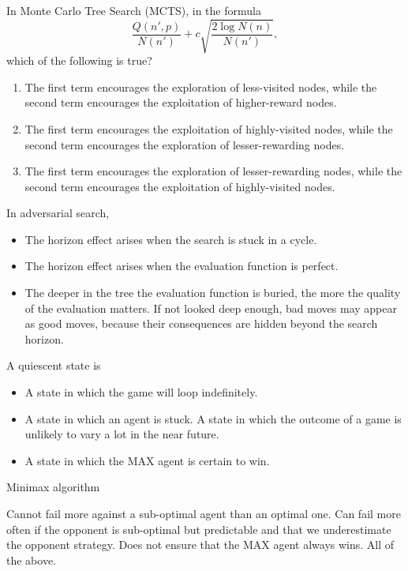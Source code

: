 \documentclass[11pt, a4paper]{article}
\begin{document}
In Monte Carlo Tree Search (MCTS), in the formula
    \begin{equation*}
        \frac{Q(n', p)}{N(n')} + c \sqrt{\frac{2 \log N(n)}{N(n')}},
    \end{equation*}
which of the following is true?
\begin{enumerate}
    \solitem The first term encourages the exploitation of higher-reward nodes, while the second encourages the exploration of
    less-visited nodes.
    \item The first term encourages the exploration of less-visited nodes, while the second term encourages the exploitation
    of higher-reward nodes.
    \item The first term encourages the exploitation of highly-visited nodes, while the second term encourages the exploration
    of lesser-rewarding nodes.
    \item The first term encourages the exploration of lesser-rewarding nodes, while the second term encourages the exploitation of highly-visited nodes.
\end{enumerate}

In adversarial search,
\begin{itemize}
    \item The horizon effect arises when the search is stuck in a cycle.
    \item The horizon effect arises when the evaluation function is perfect.
    \item The deeper in the tree the evaluation function is buried, the more the quality of the evaluation matters.
    \solitem If not looked deep enough, bad moves may appear as good moves, because their consequences are hidden beyond
    the search horizon.
\end{itemize}

A quiescent state is 
\begin{itemize}
    \item A state in which the game will loop indefinitely.
    \item A state in which an agent is stuck.
    \solitem A state in which the outcome of a game is unlikely to vary a lot in the near future.
    \item A state in which the MAX agent is certain to win.
\end{itemize}

Minimax algorithm
\begin{itemize}
    \solitem Cannot fail more against a sub-optimal agent than an optimal one.
    \solitem Can fail more often if the opponent is sub-optimal but predictable and that we underestimate the opponent strategy.
    \solitem Does not ensure that the MAX agent always wins.
    \solitem All of the above.
\end{itemize}
\end{document}
